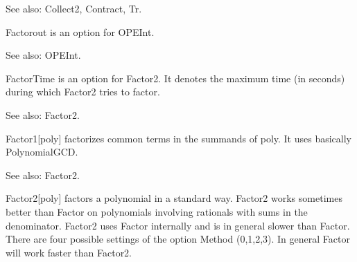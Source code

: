 See also:  Collect2, Contract, Tr.



Factorout is an option for OPEInt.

See also:  OPEInt.



FactorTime is an option for Factor2. It denotes the maximum time (in seconds) during which Factor2 tries to factor.

See also:  Factor2.



Factor1[poly] factorizes common terms { }in the summands of poly. It uses basically PolynomialGCD.

See also:  Factor2.















Factor2[poly] factors a polynomial in a standard way. Factor2 works sometimes better than Factor on polynomials involving rationals with
  sums in the denominator. Factor2 uses Factor internally and is in general slower than Factor. There are four possible settings of the
  option Method (0,1,2,3). In general Factor will work faster than Factor2.

